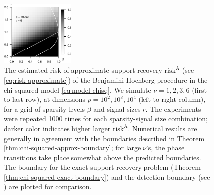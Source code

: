 \begin{figure}
      \includegraphics[width=0.32\textwidth]{./sim_weak_boundary/simulated_weak_boundary_chi-squared_nu6_p10000.eps}
      \caption{The estimated risk of approximate support recovery $\mathrm{risk}^{\mathrm{A}}$ (see \eqref{eq:risk-approximate}) of the Benjamini-Hochberg procedure in the chi-squared model \eqref{eq:model-chisq}. 
      We simulate $\nu=1, 2, 3, 6$ (first to last row), at dimensions $p=10^2, 10^3, 10^4$ (left to right column), for a grid of sparsity levels $\beta$ and signal sizes $r$.
      The experiments were repeated 1000 times for each sparsity-signal size combination; darker color indicates higher larger $\mathrm{risk}^{\mathrm{A}}$. 
      Numerical results are generally in agreement with the boundaries described in Theorem \ref{thm:chi-squared-approx-boundary}; for large $\nu$'s, the phase transitions take place somewhat above the predicted boundaries.
      The boundary for the exact support recovery problem (Theorem \ref{thm:chi-squared-exact-boundary}) and the detection boundary (see \citep{donoho2004higher}) are plotted for comparison.} 
      \label{fig:phase-simulated-chi-squared-approx-boundary}
\end{figure}


